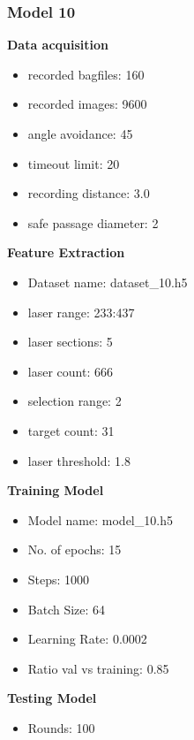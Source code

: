 \subsubsection{Model 10\label{model_10} }
\begin{multicols}{2}\textbf{Data acquisition}
\begin{itemize}
\setlength\itemsep{0.1em}
\item recorded bagfiles: 160
\item recorded images: 9600
\item angle avoidance: 45
\item timeout limit: 20
\item recording distance: 3.0
\item safe passage diameter: 2
\end{itemize}
\textbf{Feature Extraction}
\begin{itemize}
\setlength\itemsep{0.1em}
\item Dataset name: dataset\_10.h5
\item  laser range: 233:437
\item  laser sections: 5
\item  laser count: 666
\item  selection range: 2
\item  target count: 31
\item  laser threshold: 1.8
\end{itemize}
\columnbreak\textbf{Training Model}
\begin{itemize}
\setlength\itemsep{0.1em}
\item  Model name: model\_10.h5
\item  No. of epochs: 15
\item  Steps: 1000
\item  Batch Size: 64
\item  Learning Rate: 0.0002
\item  Ratio val vs training: 0.85
\end{itemize}
\textbf{Testing Model}
\begin{itemize}
\setlength\itemsep{0.1em}
\item Rounds: 100
\newline
\newline
\newline
\newline
\newline
\newline
\newline
\newline
\end{itemize}

\end{multicols}
